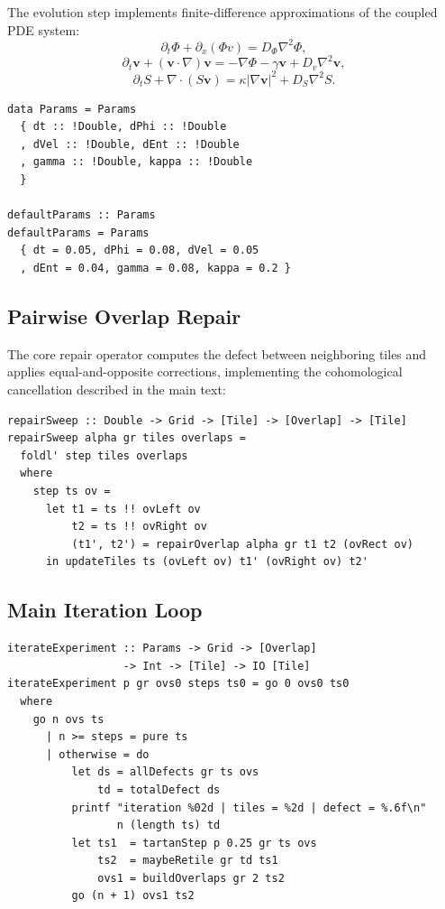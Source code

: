 \documentclass[12pt, oneside]{article}
\begin{document}
The evolution step implements finite-difference approximations of the coupled PDE system:
\[
\partial_t \Phi + \partial_x (\Phi v) = D_\Phi \nabla^2 \Phi,
\]
\[
\partial_t \mathbf{v} + (\mathbf{v} \cdot \nabla)\mathbf{v} = -\nabla \Phi - \gamma \mathbf{v} + D_v \nabla^2 \mathbf{v},
\]
\[
\partial_t S + \nabla \cdot (S\mathbf{v}) = \kappa |\nabla \mathbf{v}|^2 + D_S \nabla^2 S.
\]

\begin{lstlisting}
data Params = Params
  { dt :: !Double, dPhi :: !Double
  , dVel :: !Double, dEnt :: !Double
  , gamma :: !Double, kappa :: !Double
  }

defaultParams :: Params
defaultParams = Params
  { dt = 0.05, dPhi = 0.08, dVel = 0.05
  , dEnt = 0.04, gamma = 0.08, kappa = 0.2 }
\end{lstlisting}

\subsection{Pairwise Overlap Repair}

The core repair operator computes the defect between neighboring tiles and applies equal-and-opposite corrections, implementing the cohomological cancellation described in the main text:

\begin{lstlisting}
repairSweep :: Double -> Grid -> [Tile] -> [Overlap] -> [Tile]
repairSweep alpha gr tiles overlaps =
  foldl' step tiles overlaps
  where
    step ts ov =
      let t1 = ts !! ovLeft ov
          t2 = ts !! ovRight ov
          (t1', t2') = repairOverlap alpha gr t1 t2 (ovRect ov)
      in updateTiles ts (ovLeft ov) t1' (ovRight ov) t2'
\end{lstlisting}

\subsection{Main Iteration Loop}

\begin{lstlisting}
iterateExperiment :: Params -> Grid -> [Overlap]
                  -> Int -> [Tile] -> IO [Tile]
iterateExperiment p gr ovs0 steps ts0 = go 0 ovs0 ts0
  where
    go n ovs ts
      | n >= steps = pure ts
      | otherwise = do
          let ds = allDefects gr ts ovs
              td = totalDefect ds
          printf "iteration %02d | tiles = %2d | defect = %.6f\n"
                 n (length ts) td
          let ts1  = tartanStep p 0.25 gr ts ovs
              ts2  = maybeRetile gr td ts1
              ovs1 = buildOverlaps gr 2 ts2
          go (n + 1) ovs1 ts2
\end{lstlisting}
\end{document}

